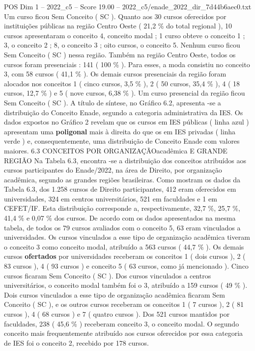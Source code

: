 \begin{textsample}{POS Dim 1 – 2022\_c5 – Score 19.00 – 2022\_c5/enade\_2022\_dir\_7d44b6aec0.txt}
Um curso ficou Sem Conceito ( SC ).
Quanto aos 30 cursos oferecidos por instituições públicas na região Centro Oeste ( 21,2 \% do total regional ), 10 cursos apresentaram o conceito 4, conceito modal ; 1 curso obteve o conceito 1 ; 3, o conceito 2 ; 8, o conceito 3 ; oito cursos, o conceito 5.
Nenhum curso ficou Sem Conceito ( SC ) nessa região.
Também na região Centro Oeste, todos os cursos foram presenciais : 141 ( 100 \% ).
Para esses, a moda consistiu no conceito 3, com 58 cursos ( 41,1 \% ).
Os demais cursos presenciais da região foram alocados nos conceitos 1 ( cinco cursos, 3,5 \% ), 2 ( 50 cursos, 35,4 \% ), 4 ( 18 cursos, 12,7 \% ) e 5 ( nove cursos, 6,38 \% ).
Um curso presencial da região ficou Sem Conceito ( SC ).
A título de síntese, no Gráfico 6.2, apresenta -se a distribuição do Conceito Enade, segundo a categoria administrativa da IES.
Os dados expostos no Gráfico 2 revelam que os cursos em IES públicas ( linha azul ) apresentam uma \textbf{poligonal} mais à direita do que os em IES privadas ( linha verde ) e, consequentemente, uma distribuição de Conceito Enade com valores maiores. 6.3 CONCEITOS POR ORGANIZAÇÃOacadêmica E GRANDE REGIÃO Na Tabela 6.3, encontra -se a distribuição dos conceitos atribuídos aos cursos participantes do Enade/2022, na área de Direito, por organização acadêmica, segundo as grandes regiões brasileiras.
Como mostram os dados da Tabela 6.3, dos 1.258 cursos de Direito participantes, 412 eram oferecidos em universidades, 324 em centros universitários, 521 em faculdades e 1 em CEFET/IF.
Esta distribuição corresponde a, respectivamente, 32,7 \%, 25,7 \%, 41,4 \% e 0,07 \% dos cursos.
De acordo com os dados apresentados na mesma tabela, de todos os 79 cursos avaliados com o conceito 5, 63 eram vinculados a universidades.
Os cursos vinculados a esse tipo de organização acadêmica tiveram o conceito 3 como conceito modal, atribuído a 563 cursos ( 44,7 \% ).
Os demais cursos \textbf{ofertados} por universidades receberam os conceitos 1 ( dois cursos ), 2 ( 83 cursos ), 4 ( 93 cursos ) e conceito 5 ( 63 cursos, como já mencionado ).
Cinco cursos ficaram Sem Conceito ( SC ).
Dos cursos vinculados a centros universitários, o conceito modal também foi o 3, atribuído a 159 cursos ( 49 \% ).
Dois cursos vinculados a esse tipo de organização acadêmica ficaram Sem Conceito ( SC ), e os outros cursos receberam os conceitos 1 ( 7 cursos ), 2 ( 81 cursos ), 4 ( 68 cursos ) e 7 ( quatro cursos ).
Dos 521 cursos mantidos por faculdades, 238 ( 45,6 \% ) receberam conceito 3, o conceito modal.
O segundo conceito mais frequentemente atribuído aos cursos oferecidos por essa categoria de IES foi o conceito 2, recebido por 178 cursos.

\end{textsample}
